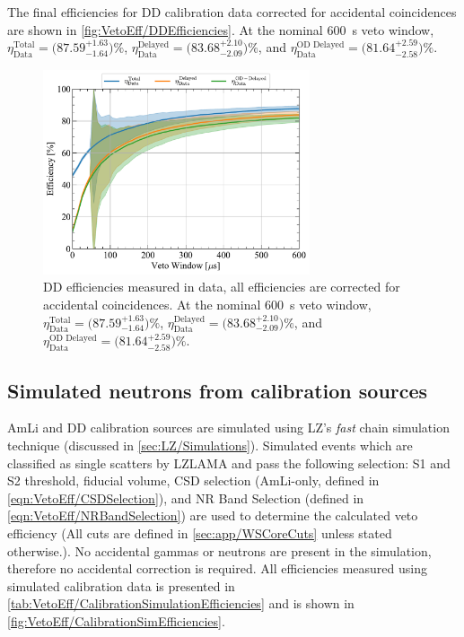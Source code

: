 The final efficiencies for DD calibration data corrected for accidental coincidences are shown in \autoref{fig:VetoEff/DDEfficiencies}. At the nominal 600~\textmu s veto window, $\eta^\text{Total}_\text{Data}=\big(87.59^{+1.63}_{-1.64}\big)\%$, $\eta^\text{Delayed}_\text{Data}=\big(83.68^{+2.10}_{-2.09}\big)\%$, and $\eta^\text{OD Delayed}_\text{Data}=\big(81.64^{+2.59}_{-2.58}\big)\%$.

\begin{figure}[ht!]
    \centering
    \includegraphics[width=0.7\textwidth]{figures/VetoEfficiency/DDEfficiencies_Data.pdf}
    \caption{DD efficiencies measured in data, all efficiencies are corrected for accidental coincidences. At the nominal 600~\textmu s veto window, $\eta^\text{Total}_\text{Data}=\big(87.59^{+1.63}_{-1.64}\big)\%$, $\eta^\text{Delayed}_\text{Data}=\big(83.68^{+2.10}_{-2.09}\big)\%$, and $\eta^\text{OD Delayed}_\text{Data}=\big(81.64^{+2.59}_{-2.58}\big)\%$.}
    \label{fig:VetoEff/DDEfficiencies}
\end{figure}
\pagebreak
\subsection{Simulated neutrons from calibration sources}
AmLi and DD calibration sources are simulated using LZ's \textit{fast} chain simulation technique (discussed in \autoref{sec:LZ/Simulations}). Simulated events which are classified as single scatters by LZLAMA and pass the following selection: S1 and S2 threshold, fiducial volume, CSD selection (AmLi-only, defined in \autoref{eqn:VetoEff/CSDSelection}), and NR Band Selection (defined in \autoref{eqn:VetoEff/NRBandSelection}) are used to determine the calculated veto efficiency (All cuts are defined in \autoref{sec:app/WSCoreCuts} unless stated otherwise.). 
No accidental gammas or neutrons are present in the simulation, therefore no accidental correction is required. All efficiencies measured using simulated calibration data is presented in \autoref{tab:VetoEff/CalibrationSimulationEfficiencies} and is shown in \autoref{fig:VetoEff/CalibrationSimEfficiencies}.

